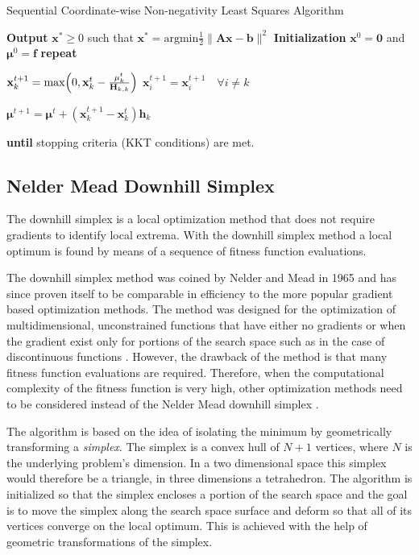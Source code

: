 \documentclass[11pt,a4paper]{report}
\begin{document}
\begin{algorithm}\label{a:sca}
\caption{Sequential Coordinate-wise Non-negativity Least Squares Algorithm}
\begin{algorithmic}[1]
\State \textbf{Output} $\mathbf{x^*} \ge 0$ such that $\mathbf{x^*} =
\mathrm{argmin} \frac{1}{2}\lVert \mathbf{Ax - b} \rVert^2$
\State \textbf{Initialization} $\mathbf{x}^0 = \mathbf{0}$ and $\mathbf{\mu}^0 =
\mathbf{f}$
\State \textbf{repeat}

\State $\mathbf{x}_k^{t+1} = \mathrm{max} \Bigr(0,\mathbf{x}_k^t -
\frac{\mathbf{\mu}_k^t}{\mathbf{H}_{k,k}} \Bigl)$
\State $ \mathbf{x}_i^{t+1} = \mathbf{x}_i^{t+1} \quad \forall i \ne k$

\State $\mathbf{\mu}^{t+1} = \mathbf{\mu}^t + (\mathbf{x}_k^{t+1} - \mathbf{x}_k^t)\mathbf{h}_k$

\EndFor

\State \textbf{until} stopping criteria (KKT conditions) are met.
\EndProcedure
\end{algorithmic}
\end{algorithm}



\subsection{Nelder Mead Downhill Simplex}

The downhill simplex is a local optimization method that does not
require gradients to identify local extrema. With the downhill simplex method a
local optimum is found by means of a sequence of fitness function evaluations.

The downhill simplex method was coined by Nelder and Mead in 1965
and has since proven itself to be comparable in efficiency to the more popular 
gradient based optimization methods. The method was designed
for the optimization of multidimensional, unconstrained functions
that have either no gradients or when the gradient exist only for
portions of the search space such as in the case of discontinuous functions
\cite{Nelder2009}. However, the drawback of the method is that many fitness function evaluations
are required. Therefore, when the computational complexity of the
fitness function is very high, other optimization methods need to
be considered instead of the Nelder Mead downhill simplex \cite{Press1992}.

The algorithm is based on the idea of isolating the
minimum by geometrically transforming a \textit{simplex}. The simplex
is a convex hull of $N+1$ vertices, where $N$ is the underlying
problem's dimension. In a two dimensional space this simplex would therefore
be a triangle, in three dimensions a tetrahedron. The algorithm is initialized
so that the simplex encloses
a portion of the search space and the goal is to move the simplex along the
search space surface and deform so that all of its vertices converge on the local optimum. This is achieved with
the help of geometric transformations of the simplex.
\end{document}
